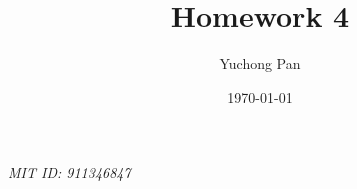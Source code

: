 \documentclass[letterpaper, reqno,11pt]{article}
\begin{document}
\title{Homework 4}
\author{Yuchong Pan}
\date{\today}
\newtheorem{theorem}{Theorem}
\newtheorem{lemma}[theorem]{Lemma}
\newtheorem{corollary}[theorem]{Corollary}
\newtheorem{fact}[theorem]{Fact}
\newtheorem{proposition}[theorem]{Proposition}
\newtheorem{claim}{Claim}
\newtheorem{exercise}{Exercise}
\theoremstyle{definition}
\newtheorem{definition}[theorem]{Definition}
\newtheorem{solution}{Solution}
%

\begin{framed}
 \hfill \thedate
\begin{center}
\Large{\thetitle}
\end{center}
 \hfill {\em MIT ID: 911346847}
\end{framed}
\end{document}
